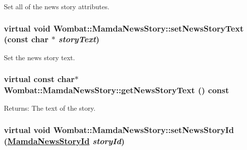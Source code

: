 Set all of the news story attributes. 

\hypertarget{classWombat_1_1MamdaNewsStory_f1488165cc643bbb22f25c4cb663b4fc}{
\subsubsection[setNewsStoryText]{\setlength{\rightskip}{0pt plus 5cm}virtual void Wombat::Mamda\-News\-Story::set\-News\-Story\-Text (const char $\ast$ {\em story\-Text})}}
\label{classWombat_1_1MamdaNewsStory_f1488165cc643bbb22f25c4cb663b4fc}


Set the news story text. 

\hypertarget{classWombat_1_1MamdaNewsStory_e68839ca0ed6aff2d7385400a59444c1}{
\subsubsection[getNewsStoryText]{\setlength{\rightskip}{0pt plus 5cm}virtual const char$\ast$ Wombat::Mamda\-News\-Story::get\-News\-Story\-Text () const}}
\label{classWombat_1_1MamdaNewsStory_e68839ca0ed6aff2d7385400a59444c1}


\begin{Desc}
\item[Returns:]The text of the story. \end{Desc}
\hypertarget{classWombat_1_1MamdaNewsStory_6cae68131977f93f240a4fcb336063b4}{
\subsubsection[setNewsStoryId]{\setlength{\rightskip}{0pt plus 5cm}virtual void Wombat::Mamda\-News\-Story::set\-News\-Story\-Id (\hyperlink{namespaceWombat_f7b94f4bb44eb78420c0d3ba0413424e}{Mamda\-News\-Story\-Id} {\em story\-Id})}}
\label{classWombat_1_1MamdaNewsStory_6cae68131977f93f240a4fcb336063b4}


